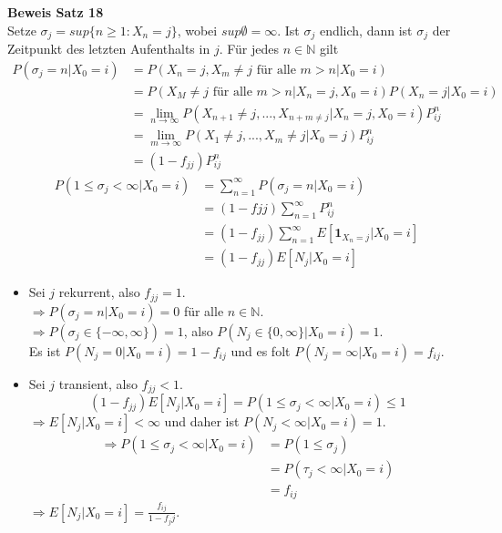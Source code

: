\documentclass[a4paper,12pt]{article}
\begin{document}
\textbf{Beweis Satz 18}\\
Setze $\sigma_j = sup\{n \geq 1: X_n = j\}$, wobei $sup \emptyset = \infty$.
Ist $\sigma_j$ endlich, dann ist $\sigma_j$ der Zeitpunkt des letzten Aufenthalts in $j$.
Für jedes $n \in \mathbb{N}$ gilt
\begin{align*}
	P(\sigma_j = n | X_0 = i) & = P(X_n = j, X_m \neq j \text{ für alle } m>n | X_0 = i)                            \\
	                          & = P(X_M \neq j \text{ für alle } m>n | X_n = j, X_0 = i)P(X_n = j | X_0 = i)        \\
	                          & = \lim_{n \to \infty}P(X_{n+1}\neq j, ..., X_{n+m \neq j}|X_n = j, X_0 = i)P_{ij}^n \\
	                          & = \lim_{m \to \infty}P(X_1 \neq j, ..., X_m \neq j| X_0 = j)P_{ij}^n                \\
	                          & = (1-f_{jj})P_{ij}^n
\end{align*}
\begin{align*}
	P(1 \leq \sigma_j < \infty | X_0 = i) & = \sum_{n=1}^{\infty}P(\sigma_j = n | X_0 = i)                             \\
	                                      & = (1-f{jj})\sum_{n=1}^{\infty}P_{ij}^n                                     \\
	                                      & = (1-f_{jj}) \sum_{n=1}^{\infty}E\left[\textbf{1}_{X_n = j}|X_0 = i\right] \\
	                                      & = (1-f_{jj})E \left[N_j|X_0 = i\right]
\end{align*}
\begin{itemize}
	\item Sei $j$ rekurrent, also $f_{jj} = 1$.\\
	      $\Rightarrow P(\sigma_j = n | X_0 = i) = 0$ für alle $n \in \mathbb{N}$.\\
	      $\Rightarrow P(\sigma_j \in \{- \infty, \infty\}) = 1$, also $P(N_j \in \{0,\infty\}|X_0 = i) = 1$.\\
	      Es ist $P(N_j = 0 | X_0 = i) = 1- f_{ij}$ und es folt $P(N_j = \infty | X_0 = i) = f_{ij}$.
	\item Sei $j$ transient, also $f_{jj} < 1$.
	      $$
		      (1-f_{jj})E \left[N_j|X_0 = i\right] = P(1 \leq \sigma_j < \infty | X_0 = i) \leq 1
	      $$
	      $\Rightarrow E \left[N_j | X_0 = i\right] < \infty$ und daher ist $P(N_j < \infty | X_0 = i) = 1$.
	      \begin{align*}
		      \Rightarrow P(1 \leq \sigma_j < \infty| X_0 = i) & = P(1 \leq \sigma_j)           \\
		                                                       & = P(\tau_j < \infty | X_0 = i) \\
		                                                       & = f_{ij}
	      \end{align*}
	      $\Rightarrow E[N_j | X_0 = i] = \frac{f_{ij}}{1-{f_jj}}$.
\end{itemize}
\end{document}
